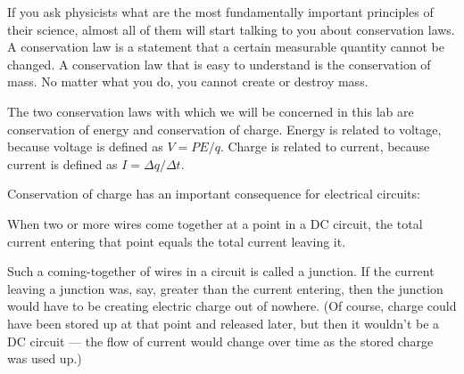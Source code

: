 \label{lab:kirchoff}

\apparatus
{}


\introduction

If you ask physicists what are the most fundamentally
important principles of their science, almost all of them
will start talking to you about conservation laws. A
conservation law is a statement that a certain measurable
quantity cannot be changed. A conservation law that is easy
to understand is the conservation of mass. No matter what
you do, you cannot create or destroy mass.

The two conservation laws with which we will be concerned in
this lab are conservation of energy and conservation of
charge. Energy is related to voltage, because voltage is
defined as $V=PE/q$. Charge is related to current, because
current is defined as $I=\Delta q/\Delta t$.

Conservation of charge has an important consequence for
electrical circuits:

When two or more wires come together at a point in a DC circuit,
the total current entering that point equals the total current
leaving it.

Such a coming-together of wires in a circuit is called a
junction. If the current leaving a junction was, say,
greater than the current entering, then the junction would
have to be creating electric charge out of nowhere. (Of
course, charge could have been stored up at that point and
released later, but then it wouldn't be a DC circuit --- the
flow of current would change over time as the stored
charge was used up.)

